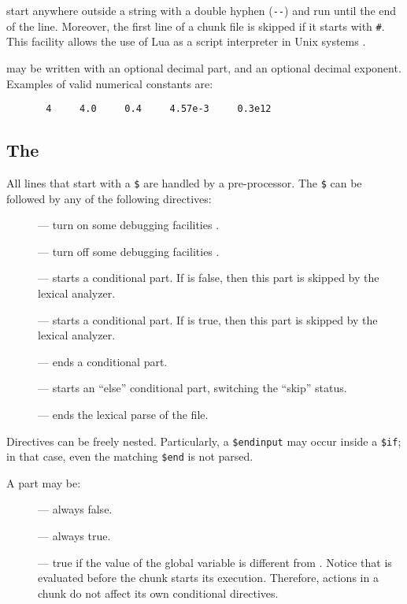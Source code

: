  start anywhere outside a string with a
double hyphen (\verb|--|) and run until the end of the line.
Moreover,
the first line of a chunk file is skipped if it starts with \verb|#|.
This facility allows the use of Lua as a script interpreter
in Unix systems .

 may be written with an optional decimal part,
and an optional decimal exponent.
Examples of valid numerical constants are:
\begin{verbatim}
       4     4.0     0.4     4.57e-3     0.3e12
\end{verbatim}

\subsection{The } \label{pre-processor}

All lines that start with a \verb|$| are handled by a pre-processor.
The \verb|$| can be followed by any of the following directives:
\begin{description}
\item[] --- turn on some debugging facilities .
\item[] --- turn off some debugging facilities .
\item[] --- starts a conditional part.
If  is false, then this part is skipped by the lexical analyzer.
\item[] --- starts a conditional part.
If  is true, then this part is skipped by the lexical analyzer.
\item[] --- ends a conditional part.
\item[] --- starts an ``else'' conditional part,
switching the ``skip'' status.
\item[] --- ends the lexical parse of the file.
\end{description}

Directives can be freely nested.
Particularly, a \verb|$endinput| may occur inside a \verb|$if|;
in that case, even the matching \verb|$end| is not parsed.

A  part may be:
\begin{description}
\item[] --- always false.
\item[] --- always true.
\item[] --- true if the value of the
global variable  is different from \nil.
Notice that  is evaluated before the chunk starts its execution.
Therefore, actions in a chunk do not affect its own conditional directives.
\end{description}

